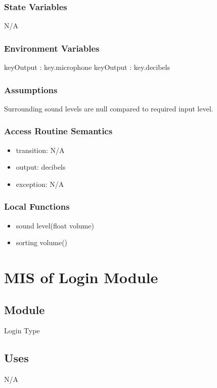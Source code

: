 \documentclass[12pt, titlepage]{article}
\begin{document}
\subsubsection{State Variables}

N/A

\subsubsection{Environment Variables}

keyOutput : {key.microphone}
keyOutput : {key.decibels}

\subsubsection{Assumptions}

Surrounding sound levels are null compared to required input level.

\subsubsection{Access Routine Semantics}

\noindent
\begin{itemize}
\item transition: N/A 
\item output: decibels
\item exception: N/A
\end{itemize}

\subsubsection{Local Functions}
\begin{itemize}
\item sound level(float volume)
\item sorting volume()
\end{itemize}



\section{MIS of Login Module} \label{Login Module}

\subsection{Module}

Login Type

\subsection{Uses}
N/A
\end{document}
